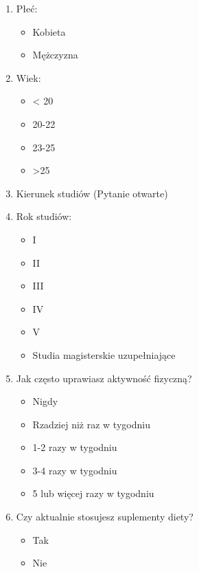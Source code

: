 \begin{appendices}
\begin{enumerate}
    \item Płeć:
    \begin{itemize}
        \item Kobieta
        \item Mężczyzna
    \end{itemize}

    \item Wiek:
    \begin{itemize}
        \item < 20
        \item 20-22
        \item 23-25
        \item >25
    \end{itemize}

    \item Kierunek studiów (Pytanie otwarte)

    \item Rok studiów:
    \begin{itemize}
        \item I
        \item II
        \item III
        \item IV
        \item V
        \item Studia magisterskie uzupełniające
    \end{itemize}

    \item Jak często uprawiasz aktywność fizyczną?
    \begin{itemize}
        \item Nigdy
        \item Rzadziej niż raz w tygodniu
        \item 1-2 razy w tygodniu
        \item 3-4 razy w tygodniu
        \item 5 lub więcej razy w tygodniu
    \end{itemize}

    \item Czy aktualnie stosujesz suplementy diety?
    \begin{itemize}
        \item Tak
        \item Nie
    \end{itemize}


\end{enumerate}
\end{appendices}
